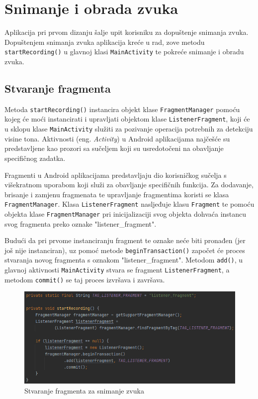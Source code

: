 \documentclass[times, utf8, zavrsni, numeric]{fer}
\begin{document}
\clearpage

\section{Snimanje i obrada zvuka}
Aplikacija pri prvom dizanju šalje upit korisniku za dopuštenje snimanja zvuka. Dopuštenjem snimanja zvuka aplikacija kreće u rad, zove metodu \verb|startRecording()| u glavnoj klasi \verb|MainActivity| te pokreće snimanje i obradu zvuka.

\subsection{Stvaranje fragmenta}
Metoda \verb|startRecording()| instancira objekt klase \verb|FragmentManager| pomoću kojeg će moći instancirati i upravljati objektom klase \verb|ListenerFragment|\cite{gstraube}, koji će u sklopu klase \verb|MainActivity| služiti za pozivanje operacija potrebnih za detekciju visine tona. Aktivnosti (eng. \textit{Activity}) u Android aplikacijama najčešće su predstavljene kao prozori sa sučeljem koji su usredotočeni na obavljanje specifičnog zadatka.

Fragmenti u Android aplikacijama predstavljaju dio korisničkog sučelja s višekratnom uporabom koji služi za obavljanje specifičnih funkcija. Za dodavanje, brisanje i zamjenu fragmenata te upravljanje fragmentima koristi se klasa \verb|FragmentManager|. Klasa \verb|ListenerFragment| nasljeđuje klasu \verb|Fragment| te pomoću objekta klase \verb|FragmentManager| pri inicijalizaciji svog objekta dohvaća instancu svog fragmenta preko oznake "listener\_fragment".

Budući da pri prvome instanciranju fragment te oznake neće biti pronađen (jer još nije instanciran), uz pomoć metode \verb|beginTransaction()| započet će proces stvaranja novog fragmenta s oznakom "listener\_fragment". Metodom \verb|add()|, u glavnoj aktivnosti \verb|MainActivity| stvara se fragment \verb|ListenerFragment|, a metodom \verb|commit()| se taj proces izvršava i završava.

\clearpage
\renewcommand{\figurename}{Kod}
\begin{figure}
	\centerline{\includegraphics[width=\textwidth]{startRecording.png}}
	\caption{Stvaranje fragmenta za snimanje zvuka}
	\label{fig}
\end{figure}
\end{document}
